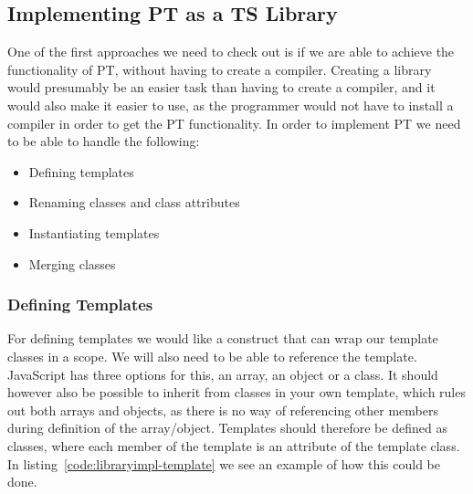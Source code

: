
\subsection{Implementing PT as a TS Library}\label{subsec:implementing-pt-as-a-ts-library}

One of the first approaches we need to check out is if we are able to achieve the functionality of PT, without having to create a compiler.
Creating a library would presumably be an easier task than having to create a compiler, and it would also make it easier to use, as the programmer would not have to install a compiler in order to get the PT functionality.
In order to implement PT we need to be able to handle the following:

\begin{itemize}
    \item Defining templates
    \item Renaming classes and class attributes
    \item Instantiating templates
    \item Merging classes
\end{itemize}

\subsubsection{Defining Templates}\label{subsubsec:defining-templates}

For defining templates we would like a construct that can wrap our template classes in a scope.
We will also need to be able to reference the template.
JavaScript has three options for this, an array, an object or a class.
It should however also be possible to inherit from classes in your own template, which rules out both arrays and objects, as there is no way of referencing other members during definition of the array/object.
Templates should therefore be defined as classes, where each member of the template is an attribute of the template class.
In listing~\vref{code:libraryimpl-template} we see an example of how this could be done.




